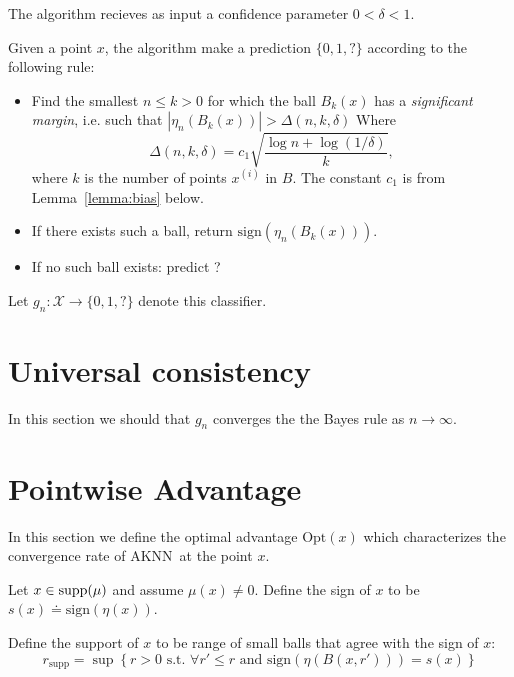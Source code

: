 \documentclass{article}
\def\X{{\mathcal X}}
\def\supp{{\rm supp}}
\newcommand{\sign}{\mbox{sign}}
\newcommand{\algname}{\textsc{AKNN}}
\newcommand{\comment}[3]{}  %
\newcommand{\shay}[1]{\comment{purple}{Shay}{#1}}
\newcommand{\yoav}[1]{\comment{green}{Yoav}{#1}}
\begin{document}
The algorithm recieves as input a confidence parameter $0 < \delta <1$.

Given a point $x$, the algorithm make a prediction $\{0,1,?\}$  according to the following rule:

\begin{itemize}
\item Find the smallest $n \leq k>0$ for which the ball $B_k(x)$ has a
  {\em significant margin}, i.e. such that $\left|\eta_n(B_k(x))\right| > \Delta(n,k,\delta)$
  Where
  $$ \Delta(n,k,\delta) = c_1 \sqrt{\frac{\log n + \log (1/\delta)}{k}}, $$
where $k$ is the number of points $x^{(i)}$ in $B$. The constant $c_1$ is from Lemma~\ref{lemma:bias} below.
\shay{I presume $d_0$ denotes the VC dimension of the family of all balls? 
$d_0$ should be set to $1$ in the case of the ``expected-case'' analysis}
\yoav{I suggest we push $d_0$ to the end of the paper}
\item If there exists such a ball, return $\sign(\eta_n(B_k(x)))$.
\item If no such ball exists: predict ?
\end{itemize}
Let $g_n: \X \rightarrow \{0,1,?\}$ denote this classifier.

\section{Universal consistency}
\label{sec:universal-consistency}
In this section we should that $g_n$ converges the the Bayes rule as
$n \to \infty$.


\section{Pointwise Advantage}

\newcommand{\advantage}{\mbox{adv}}
\newcommand{\opt}{\mbox{Opt}}
\newcommand{\eopt}{\epsilon \mbox{-Opt}}

In this section we define the optimal advantage $\opt(x)$ which
characterizes the convergence rate of \algname\ at the point $x$.

Let $x \in \supp(\mu)$ and assume $\mu(x) \neq 0$. Define the sign of
$x$ to be $s(x) \doteq \sign(\eta(x))$.

\newcommand{\rsupp}{r_{\mbox{supp}}}
Define the support of $x$ to be range of small balls that agree with
the sign of $x$:
\begin{equation}
\rsupp = \sup \left\{ r>0 \mbox{ s.t. } \forall r' \leq r \mbox{ and } \sign(\eta(B(x,r')))
  =  s(x) \right\}
\end{equation}
\end{document}
